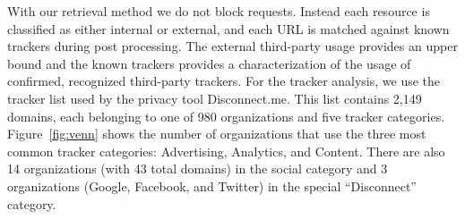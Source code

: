 \documentclass[letterpaper]{sig-alternate-10pt}
\begin{document}
With our retrieval method
we do not block requests.
Instead 
each resource is classified as either internal or external, 
and each URL is matched against known trackers during post processing.
The external third-party usage provides an upper bound and
the known trackers provides a characterization of the
usage of confirmed, recognized third-party trackers.
For the tracker analysis, we use the tracker list
used by the privacy tool Disconnect.me.  This list contains 2,149 domains,
each belonging to one of 980 organizations and five tracker categories.
Figure~\ref{fig:venn} shows
the number 
of organizations that use the three most common tracker categories: 
Advertising, Analytics, and Content.
There are also 14 organizations (with 43 total domains) 
in the social category and 3 organizations (Google, Facebook, and Twitter)
in the special ``Disconnect'' category.




%
\end{document}
